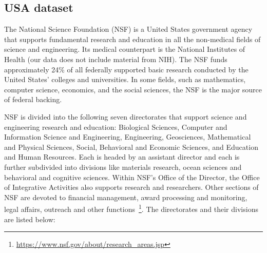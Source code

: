 \documentclass[12pt]{report}
\begin{document}
\subsection{USA dataset}

The National Science Foundation (NSF) is a United States government
agency that supports fundamental research and education in all the
non-medical fields of science and engineering. Its medical counterpart
is the National Institutes of Health (our data does not include 
material from NIH). The NSF funds approximately 24\% of all
federally supported basic research conducted by the United States'
colleges and universities. In some fields, such as mathematics,
computer science, economics, and the social sciences, the NSF is the
major source of federal backing.

NSF is divided into the following seven directorates that support science and
engineering research and education: Biological Sciences, Computer and
Information Science and Engineering, Engineering, Geosciences, Mathematical and
Physical Sciences, Social, Behavioral and Economic Sciences, and Education and
Human Resources. Each is headed by an assistant director and each is further
subdivided into divisions like materials research, ocean sciences and behavioral
and cognitive sciences. Within NSF's Office of the Director, the Office of
Integrative Activities also supports research and researchers. Other sections of
NSF are devoted to financial management, award processing and monitoring, legal
affairs, outreach and other functions~\footnote{\url{https://www.nsf.gov/about/research_areas.jsp}}. The directorates and their divisions are listed below:
\end{document}
